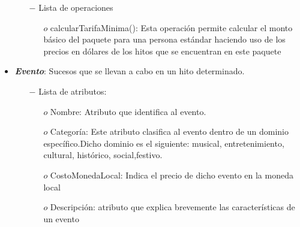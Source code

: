 \documentclass[a4paper]{article}
\begin{document}
\begin{itemize}
{\begin{itemize}
        
        \begin{itemize}
       \item[$o$]Nombre: Atributo que identifica un nombre de un paquete. El nombre de un paquete va a ser creativo para atraer la atención de un usuario
\item[$o$]Precio: Es el monto que paga un usuario estándar. Un usuario estándar es aquel que no es estudiante, no pertenece a la tercera edad y no es un niño. \item[$o$] CostoEstudiante: Es precio del paquete que paga un usuario o un acompañante que sea estudiante
\item[$o$] CostoTerceraEdad: Es el precio que paga un usuario o acompañante que pertenezca a la tercera edad.
\item[$o$] CostoNino: Es el precio que paga un acompañante al ser un niño.
\item[$o$] Descripción: En este atributo se explica brevemente las características que el paquete incluye.

        \end{itemize}
      
      \item[$-$] Lista de operaciones
   
   
      \begin{itemize}
      \item[$o$] calcularTarifaMinima(): Esta operación permite calcular el monto básico del paquete para una persona estándar haciendo uso de los precios en dólares de los hitos que se encuentran en este paquete
   \end{itemize}


    \end{itemize}

}


\item{
	\textbf{\textit{Evento}}: Sucesos que se llevan a cabo en un hito determinado.
  		
     \begin{itemize}   
  		\item[$-$] Lista de atributos:
        
        
        
        
        \begin{itemize}
       \item[$o$]Nombre: Atributo que identifica al evento.
 \item[$o$]Categoría: Este atributo clasifica al evento dentro de un dominio específico.Dicho dominio es el siguiente: musical, entretenimiento, cultural, histórico, social,festivo.
 \item[$o$]CostoMonedaLocal: Indica el precio de dicho evento en la moneda local
 \item[$o$]Descripción: atributo que explica brevemente las características de un evento


\end{itemize}
\end{itemize}}
\end{itemize}
\end{document}
